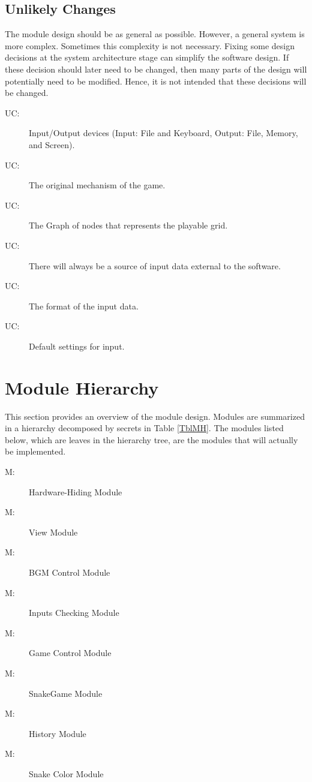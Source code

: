 \documentclass[12pt, titlepage]{article}
\newcounter{ucnum}
\newcommand{\uctheucnum}{UC\theucnum}
\newcounter{mnum}
\newcommand{\mthemnum}{M\themnum}
\begin{document}
\subsection{Unlikely Changes} \label{SecUchange}

The module design should be as general as possible. However, a general system is
more complex. Sometimes this complexity is not necessary. Fixing some design
decisions at the system architecture stage can simplify the software design. If
these decision should later need to be changed, then many parts of the design
will potentially need to be modified. Hence, it is not intended that these
decisions will be changed.

\begin{description}
\item[ \uctheucnum \label{ucIO}:] Input/Output devices
  (Input: File and Keyboard, Output: File, Memory, and Screen).
\item[ \uctheucnum \label{ucO}:] The original mechanism of the game.
\item[ \uctheucnum \label{ucG}:] The Graph of nodes that represents the playable grid.
\item[ \uctheucnum \label{ucS}:] There will always be
  a source of input data external to the software.
\item[ \uctheucnum \label{ucF}:]
The format of the input data.
\item[ \uctheucnum \label{ucDeafault}:]
Default settings for input.
\end{description}

\section{Module Hierarchy} \label{SecMH}

This section provides an overview of the module design. Modules are summarized
in a hierarchy decomposed by secrets in Table \ref{TblMH}. The modules listed
below, which are leaves in the hierarchy tree, are the modules that will
actually be implemented.

\begin{description}
\item [ \mthemnum \label{mHH}:] Hardware-Hiding Module
\item [ \mthemnum \label{mV}:] View Module
\item [ \mthemnum \label{mBC}:] BGM Control Module
\item [ \mthemnum \label{mIC}:] Inputs Checking Module
\item [ \mthemnum \label{mGC}:] Game Control Module
\item [ \mthemnum \label{mS}:] SnakeGame Module
\item [ \mthemnum \label{mH}:] History Module
\item [ \mthemnum \label{mSC}:] Snake Color Module
\end{description}
\end{document}
